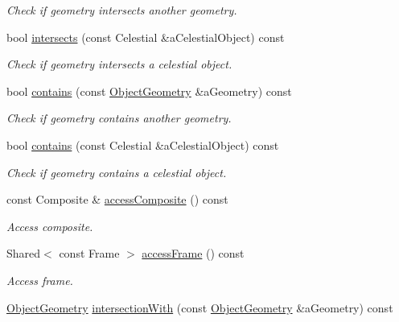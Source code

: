 \begin{DoxyCompactItemize}
\begin{DoxyCompactList}\small\item\em Check if geometry intersects another geometry. \end{DoxyCompactList}\item 
bool \hyperlink{classostk_1_1simulation_1_1component_1_1_geometry_a954a8a7af85cde7d9407b98ac9dd23c5}{intersects} (const Celestial \&a\+Celestial\+Object) const
\begin{DoxyCompactList}\small\item\em Check if geometry intersects a celestial object. \end{DoxyCompactList}\item 
bool \hyperlink{classostk_1_1simulation_1_1component_1_1_geometry_af39e2376a527720e37e46dc57f3eb6a5}{contains} (const \hyperlink{namespaceostk_1_1simulation_1_1component_a911837ab7e6f8471e9927a74795a0077}{Object\+Geometry} \&a\+Geometry) const
\begin{DoxyCompactList}\small\item\em Check if geometry contains another geometry. \end{DoxyCompactList}\item 
bool \hyperlink{classostk_1_1simulation_1_1component_1_1_geometry_ade44921582930e30c598dbeba365f528}{contains} (const Celestial \&a\+Celestial\+Object) const
\begin{DoxyCompactList}\small\item\em Check if geometry contains a celestial object. \end{DoxyCompactList}\item 
const Composite \& \hyperlink{classostk_1_1simulation_1_1component_1_1_geometry_a1a225b42f1350dfe4cca7937dddbf2b9}{access\+Composite} () const
\begin{DoxyCompactList}\small\item\em Access composite. \end{DoxyCompactList}\item 
Shared$<$ const Frame $>$ \hyperlink{classostk_1_1simulation_1_1component_1_1_geometry_afed7aa31b6b37090e90a7723af33f346}{access\+Frame} () const
\begin{DoxyCompactList}\small\item\em Access frame. \end{DoxyCompactList}\item 
\hyperlink{namespaceostk_1_1simulation_1_1component_a911837ab7e6f8471e9927a74795a0077}{Object\+Geometry} \hyperlink{classostk_1_1simulation_1_1component_1_1_geometry_a3fe1b4be3ee05faab0ff647697afcd6e}{intersection\+With} (const \hyperlink{namespaceostk_1_1simulation_1_1component_a911837ab7e6f8471e9927a74795a0077}{Object\+Geometry} \&a\+Geometry) const

\end{DoxyCompactItemize}
